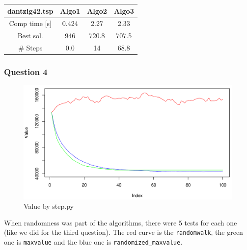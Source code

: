\documentclass[a4paper,10pt]{article}
\begin{document}
\begin{center}
\begin{tabular}{|c|c|c|c|}
\hline 
dantzig42.tsp & Algo1 & Algo2 & Algo3 \\ 
\hline 
Comp time [s] & 0.424 & 2.27 & 2.33 \\ 
\hline 
Best sol. & 946 & 720.8 & 707.5 \\ 
\hline 
\# Steps & 0.0 & 14 & 68.8 \\ 
\hline 
\end{tabular} 
\end{center}

\subsubsection{Question 4}
\begin{center}
\begin{figure}[ht]
		\includegraphics[scale=.35]{mile4_1_1.png}
	\caption{Value by step.py}
\end{figure}
\end{center}
When randomness was part of the algorithms, there were 5 tests for each one (like we did for the third question). The red curve is the \texttt{randomwalk}, the green one is \texttt{maxvalue} and the blue one is \texttt{randomized\_maxvalue}.
\end{document}

